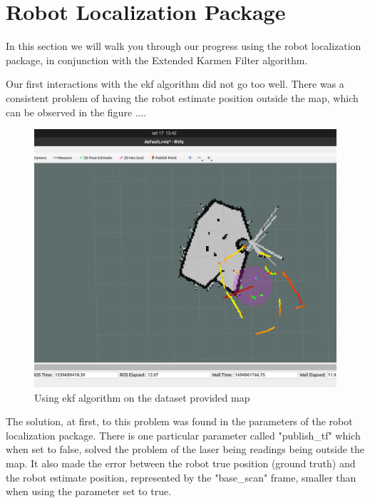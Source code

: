 \section{Robot Localization Package}

In this section we will walk you through our progress using the robot localization package, in conjunction with the Extended Karmen Filter algorithm. 

Our first interactions with the ekf algorithm did not go too well. There was a consistent problem of having the robot estimate position outside the map, which can be observed in the figure ....

\begin{figure}[h]
\centering
\includegraphics[scale=0.4]{./Images/ekfOutsideMap}
\caption{Using ekf algorithm on the dataset provided map}
\label{fig:flowchart}
\end{figure}

The solution, at first, to this problem was found in the parameters of the robot localization package. There is one particular parameter called "publish\_tf" which when set to false, solved the problem of the laser being readings being outside the map. It also made the error between the robot true position (ground truth) and the robot estimate position, represented by the "base\_scan" frame, smaller than when using the parameter set to true. 

